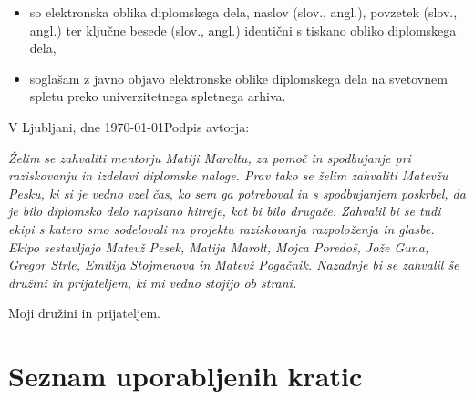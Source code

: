 \documentclass[a4paper, 12pt]{book}
\newcommand{\clearemptydoublepage}{\newpage{\pagestyle{empty}\cleardoublepage}}
\begin{document}
{\begin{itemize}
	\item	so elektronska oblika diplomskega dela, naslov (slov., angl.), povzetek (slov., angl.) ter ključne besede (slov., angl.) identični s tiskano obliko diplomskega dela,
	\item soglašam z javno objavo elektronske oblike diplomskega dela na svetovnem spletu preko univerzitetnega spletnega arhiva.	
\end{itemize}

\vspace{1cm}
\noindent V Ljubljani, dne \today \hfill Podpis avtorja:

\clearemptydoublepage

\thispagestyle{empty}\mbox{}\vfill\null\it%
Želim se zahvaliti mentorju Matiji Maroltu, za pomoč in spodbujanje pri raziskovanju in izdelavi diplomske naloge. Prav tako se želim zahvaliti Matevžu Pesku, ki si je vedno vzel čas, ko sem ga potreboval in s spodbujanjem poskrbel, da je bilo diplomsko delo napisano hitreje, kot bi bilo drugače. Zahvalil bi se tudi ekipi s katero smo sodelovali na projektu raziskovanja razpoloženja in glasbe. Ekipo sestavljajo Matevž Pesek, Matija Marolt, Mojca Poredoš, Jože Guna, Gregor Strle, Emilija Stojmenova in Matevž Pogačnik. Nazadnje bi se zahvalil še družini in prijateljem, ki mi vedno stojijo ob strani. 
\rm\normalfont

\clearemptydoublepage

\thispagestyle{empty}\mbox{}{\textheight}\mbox{}\hfill\begin{minipage}{0.55\textwidth}%
Moji družini in prijateljem.
\normalfont\end{minipage}

\clearemptydoublepage

\def\thepage{}%
\tableofcontents{}


\clearemptydoublepage


\chapter*{Seznam uporabljenih kratic}

}
\end{document}
